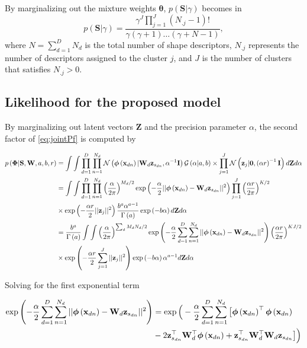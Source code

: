	
	By marginalizing out the mixture weights $\boldsymbol{\theta}$, $p\left(\mathbf{S}|\gamma\right)$ becomes in
	\begin{equation}
	p\left(\mathbf{S}|\gamma\right) =\frac{\gamma^{J}\prod\limits_{j=1}^{J}{\left(N_{.j}-1\right)!}}{\gamma\left(\gamma+1\right)\dots\left(\gamma+N-1\right)},
	\end{equation}
	where $N=\sum\limits_{d=1}^{D}N_d$ is the total number of shape
	descriptors, $N_{.j}$ represents the number of descriptors assigned to
	the cluster $j$, and $J$ is the number of clusters that satisfies
	$N_{.j}>0$. 
	
	\subsection{Likelihood for the proposed model}
	By marginalizing out latent vectors $\mathbf{Z}$ and the
	precision parameter $\alpha$, the second factor of \eqref{eq:jointPf} is
	computed by
	
	\begin{align}
	p\left(\boldsymbol{\Phi}|\mathbf{S},\mathbf{W},a,b,r\right) &=  \int \int \prod_{d=1}^{D}\prod_{n=1}^{N_d}{\mathcal{N}\left(\boldsymbol{\phi}\left(\mathbf{x}_{dn}\right)|\mathbf{W}_d \mathbf{z}_{s_{dn}},\alpha^{-1}\mathbf{I}\right)\mathcal{G}\left(\alpha|a,b\right)} \times \prod_{j=1}^{J}\mathcal{N}\left(\mathbf{z}_j|\mathbf{0},\left(\alpha r\right)^{-1}\mathbf{I}\right)d\boldsymbol{\mathrm{Z}} d\alpha  \notag \\
	&=\int \int \prod_{d=1}^{D}\prod_{n=1}^{N_d}\left(\frac{\alpha}{2\pi}\right)^{M_d /2}\exp\left(-\frac{\alpha}{2}||\boldsymbol{\phi}\left(\mathbf{x}_{dn}\right)-\mathbf{W}_d\mathbf{z}_{s_{dn}}||^2\right) \prod_{j=1}^{J}\left(\frac{\alpha r}{2\pi}\right)^{K/2} \notag \\
	&\times \exp\left(-\frac{\alpha r}{2}||\mathbf{z}_j||^2\right)\frac{b^a \alpha^{a-1}}{\Gamma\left(a\right)}\exp\left(-b\alpha\right)d\boldsymbol{\mathrm{Z}} d\alpha \notag\\
	&=\frac{b^a}{\Gamma\left(a\right)}\int \int \left(\frac{\alpha}{2\pi}\right)^{\sum_d M_d N_d /2}\exp\left(-\frac{\alpha}{2} \sum_{d=1}^{D}\sum_{n=1}^{N_d}||\boldsymbol{\phi}\left(\mathbf{x}_{dn}\right)-\mathbf{W}_d\mathbf{z}_{s_{dn}}||^2\right)\left(\frac{\alpha r}{2\pi}\right)^{KJ/2} \notag \\
	&\times \exp\left(-\frac{\alpha r}{2} \sum_{j=1}^{J}||\mathbf{z}_j||^2\right)\exp\left(-b\alpha\right)\alpha^{a-1}d\boldsymbol{\mathrm{Z}} d\alpha 
	\label{eq:llnmlinf}
	\end{align}
	
	
	Solving for the first exponential term
	
	\begin{align}
	\exp\left(-\frac{\alpha}{2} \sum_{d=1}^{D}\sum_{n=1}^{N_d}||\boldsymbol{\phi}\left(\mathbf{x}_{dn}\right)-\mathbf{W}_d\mathbf{z}_{s_{dn}}||^2\right) &= \exp\Big(-\frac{\alpha}{2} \sum_{d=1}^{D}\sum_{n=1}^{N_d}\big[ \boldsymbol{\phi}\left(\mathbf{x}_{dn}\right)^\top \boldsymbol{\phi}\left(\mathbf{x}_{dn}\right)  \notag\\
	&  - 2 \mathbf{z}_{s_{dn}} ^\top \mathbf{W}_d^\top \boldsymbol{\phi}\left(\mathbf{x}_{dn}\right) + \mathbf{z}_{s_{dn}}^\top \mathbf{W}_d^\top \mathbf{W}_d \mathbf{z}_{s_{dn}} \big]\Big) \notag\\
	\label{eq:exp_XWzlinf}
	\end{align}
	

